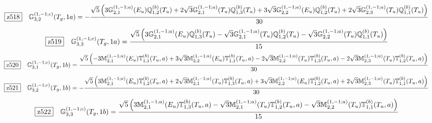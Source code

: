 \documentclass[fleqn,10pt,landscape]{jsarticle}
\begin{document}
\begin{dmath*}
\hspace*{3mm}\fbox{z518}\quad \mathbb{G}_{3,2}^{(1,-1;c)}(T_{g},1a)=- \frac{\sqrt{5} \left(3 \mathbb{G}_{2,1}^{(1,-1;a)}(E_{u}) \mathbb{Q}_{1,2}^{(b)}(T_{u}) + 2 \sqrt{3} \mathbb{G}_{2,1}^{(1,-1;a)}(T_{u}) \mathbb{Q}_{1,3}^{(b)}(T_{u}) + 3 \sqrt{3} \mathbb{G}_{2,2}^{(1,-1;a)}(E_{u}) \mathbb{Q}_{1,2}^{(b)}(T_{u}) + 2 \sqrt{3} \mathbb{G}_{2,3}^{(1,-1;a)}(T_{u}) \mathbb{Q}_{1,1}^{(b)}(T_{u})\right)}{30}
\end{dmath*}
\begin{dmath*}
\hspace*{3mm}\fbox{z519}\quad \mathbb{G}_{3,3}^{(1,-1;c)}(T_{g},1a)=\frac{\sqrt{5} \left(3 \mathbb{G}_{2,1}^{(1,-1;a)}(E_{u}) \mathbb{Q}_{1,3}^{(b)}(T_{u}) - \sqrt{3} \mathbb{G}_{2,1}^{(1,-1;a)}(T_{u}) \mathbb{Q}_{1,2}^{(b)}(T_{u}) - \sqrt{3} \mathbb{G}_{2,2}^{(1,-1;a)}(T_{u}) \mathbb{Q}_{1,1}^{(b)}(T_{u})\right)}{15}
\end{dmath*}
\begin{dmath*}
\hspace*{3mm}\fbox{z520}\quad \mathbb{G}_{3,1}^{(1,-1;c)}(T_{g},1b)=\frac{\sqrt{5} \left(- 3 \mathbb{M}_{2,1}^{(1,-1;a)}(E_{u}) \mathbb{T}_{1,1}^{(b)}(T_{u},a) + 3 \sqrt{3} \mathbb{M}_{2,2}^{(1,-1;a)}(E_{u}) \mathbb{T}_{1,1}^{(b)}(T_{u},a) - 2 \sqrt{3} \mathbb{M}_{2,2}^{(1,-1;a)}(T_{u}) \mathbb{T}_{1,3}^{(b)}(T_{u},a) - 2 \sqrt{3} \mathbb{M}_{2,3}^{(1,-1;a)}(T_{u}) \mathbb{T}_{1,2}^{(b)}(T_{u},a)\right)}{30}
\end{dmath*}
\begin{dmath*}
\hspace*{3mm}\fbox{z521}\quad \mathbb{G}_{3,2}^{(1,-1;c)}(T_{g},1b)=- \frac{\sqrt{5} \left(3 \mathbb{M}_{2,1}^{(1,-1;a)}(E_{u}) \mathbb{T}_{1,2}^{(b)}(T_{u},a) + 2 \sqrt{3} \mathbb{M}_{2,1}^{(1,-1;a)}(T_{u}) \mathbb{T}_{1,3}^{(b)}(T_{u},a) + 3 \sqrt{3} \mathbb{M}_{2,2}^{(1,-1;a)}(E_{u}) \mathbb{T}_{1,2}^{(b)}(T_{u},a) + 2 \sqrt{3} \mathbb{M}_{2,3}^{(1,-1;a)}(T_{u}) \mathbb{T}_{1,1}^{(b)}(T_{u},a)\right)}{30}
\end{dmath*}
\begin{dmath*}
\hspace*{3mm}\fbox{z522}\quad \mathbb{G}_{3,3}^{(1,-1;c)}(T_{g},1b)=\frac{\sqrt{5} \left(3 \mathbb{M}_{2,1}^{(1,-1;a)}(E_{u}) \mathbb{T}_{1,3}^{(b)}(T_{u},a) - \sqrt{3} \mathbb{M}_{2,1}^{(1,-1;a)}(T_{u}) \mathbb{T}_{1,2}^{(b)}(T_{u},a) - \sqrt{3} \mathbb{M}_{2,2}^{(1,-1;a)}(T_{u}) \mathbb{T}_{1,1}^{(b)}(T_{u},a)\right)}{15}
\end{dmath*}
\end{document}
